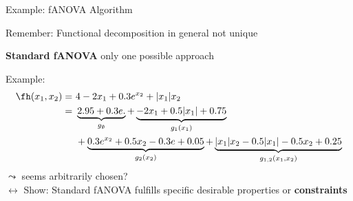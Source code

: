 \documentclass[10pt,compress,t,notes=noshow, xcolor=table]{beamer}
\begin{document}


\begin{framei}[align=top]{Example: fANOVA Algorithm}
\item Remember: Functional decomposition in general not unique
\item \textbf{Standard fANOVA} only one possible approach
\item Example:
\begin{align*}
\fh(x_1, x_2) =\,&\,4 - 2x_1 + 0.3 e^{x_2} + |x_1|x_2 \\
=\,&\,\underbrace{2.95 + 0.3 e.}_{g_\emptyset} + \underbrace{-2x_1 + 0.5|x_1| + 0.75}_{g_1(x_1)} \\
\,&\,+ \underbrace{0.3 e^{x_2} + 0.5x_2 - 0.3e + 0.05}_{g_2(x_2)} + \underbrace{|x_1| x_2 - 0.5 |x_1| - 0.5 x_2 + 0.25}_{g_{1,2}(x_1, x_2)}
\end{align*}
$\leadsto$ seems arbitrarily chosen? \\
$\longleftrightarrow$ Show: Standard fANOVA fulfills specific desirable properties or \textbf{constraints}
\end{framei}
\end{document}
